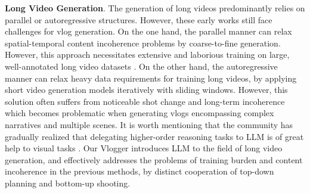 \noindent\textbf{Long Video Generation}.
The generation of long videos predominantly relies on parallel \cite{Yin2023NUWAXLDO} or autoregressive \cite{villegas2023phenaki} structures.
However,
these early works still face challenges for vlog generation.
On the one hand,
the parallel manner can relax spatial-temporal content incoherence problems by coarse-to-fine generation.
However, this approach necessitates extensive and laborious training on large, well-annotated long video datasets \cite{Yin2023NUWAXLDO}.
On the other hand,
the autoregressive manner can relax heavy data requirements for training long videos,
by applying short video generation models iteratively with sliding windows.
However,
this solution often suffers from noticeable shot change and long-term incoherence \cite{villegas2023phenaki, chen2023seine, he2023latent, Qiu2023FreeNoiseTL, Wang2023GenLVideoMT}
which becomes problematic when generating vlogs encompassing complex narratives and multiple scenes. 
It is worth mentioning that the community has gradually realized that delegating higher-order reasoning tasks to LLM is of great help to visual tasks \cite{Wu2023VisualCT, gupta2023visual, Li2023VideoChatCV, Zhang2023ControllableTG, Liu2023VisualIT, Zhu2023MiniGPT4EV, Huang2023FreeBloomZT, BetkerImprovingIG}.
Our Vlogger introduces LLM to the field of long video generation,
and effectively addresses the problems of training burden and content incoherence in the previous methods,
by distinct cooperation of top-down planning and bottom-up shooting.
